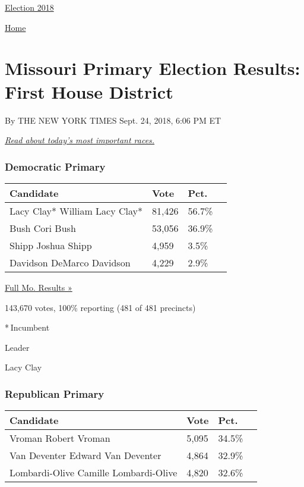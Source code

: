 \href{//www.nytimes3xbfgragh.onion}{}\href{https://www.nytimes3xbfgragh.onion/interactive/2018/us/elections/calendar-primary-results.html}{
Election 2018}

\href{//www.nytimes3xbfgragh.onion}{ Home}

\hypertarget{missouri-primary-election-results-first-house-district}{%
\section{Missouri Primary Election Results: First House
District}\label{missouri-primary-election-results-first-house-district}}

By THE NEW YORK TIMES Sept. 24, 2018, 6:06 PM ET

\href{https://www.nytimes3xbfgragh.onion/2018/08/07/us/politics/primary-election-today.html}{\emph{Read
about today's most important races.}}

\hypertarget{democratic-primary}{%
\subsubsection{Democratic Primary}\label{democratic-primary}}

\begin{longtable}[]{@{}llll@{}}
\toprule
Candidate & Vote & Pct. &\tabularnewline
\midrule
\endhead
 Lacy Clay* William Lacy Clay* & 81,426 & 56.7\% &\tabularnewline
 Bush Cori Bush & 53,056 & 36.9\% &\tabularnewline
 Shipp Joshua Shipp & 4,959 & 3.5\% &\tabularnewline
 Davidson DeMarco Davidson & 4,229 & 2.9\% &\tabularnewline
\bottomrule
\end{longtable}

\href{https://www.nytimes3xbfgragh.onion/elections/results/missouri}{Full
Mo. Results »}

143,670 votes, 100\% reporting (481 of 481 precincts)

* Incumbent

Leader

 Lacy Clay

\hypertarget{republican-primary}{%
\subsubsection{Republican Primary}\label{republican-primary}}

\begin{longtable}[]{@{}llll@{}}
\toprule
Candidate & Vote & Pct. &\tabularnewline
\midrule
\endhead
 Vroman Robert Vroman & 5,095 & 34.5\% &\tabularnewline
 Van Deventer Edward Van Deventer & 4,864 & 32.9\% &\tabularnewline
 Lombardi-Olive Camille Lombardi-Olive & 4,820 & 32.6\% &\tabularnewline
\bottomrule
\end{longtable}

